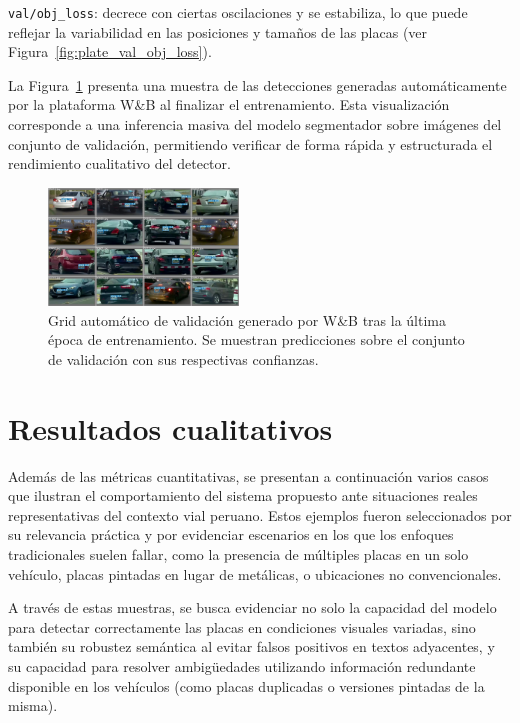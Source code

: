 \documentclass[conference]{IEEEtran}
\begin{document}
\texttt{val/obj\_loss}: decrece con ciertas oscilaciones y se estabiliza, lo que puede reflejar la variabilidad en las posiciones y tamaños de las placas (ver Figura~\ref{fig:plate_val_obj_loss}).

La Figura~\ref{fig:plate_val_grid} presenta una muestra de las detecciones generadas automáticamente por la plataforma W\&B al finalizar el entrenamiento. Esta visualización corresponde a una inferencia masiva del modelo segmentador sobre imágenes del conjunto de validación, permitiendo verificar de forma rápida y estructurada el rendimiento cualitativo del detector.

\begin{figure}[ht]
\centering
\includegraphics[width=0.45\textwidth]{figs/validation_matrix.jpg}
\caption{Grid automático de validación generado por W\&B tras la última época de entrenamiento. Se muestran predicciones sobre el conjunto de validación con sus respectivas confianzas.}
\label{fig:plate_val_grid}
\end{figure}


\section{Resultados cualitativos}

Además de las métricas cuantitativas, se presentan a continuación varios casos que ilustran el comportamiento del sistema propuesto ante situaciones reales representativas del contexto vial peruano. Estos ejemplos fueron seleccionados por su relevancia práctica y por evidenciar escenarios en los que los enfoques tradicionales suelen fallar, como la presencia de múltiples placas en un solo vehículo, placas pintadas en lugar de metálicas, o ubicaciones no convencionales.

A través de estas muestras, se busca evidenciar no solo la capacidad del modelo para detectar correctamente las placas en condiciones visuales variadas, sino también su robustez semántica al evitar falsos positivos en textos adyacentes, y su capacidad para resolver ambigüedades utilizando información redundante disponible en los vehículos (como placas duplicadas o versiones pintadas de la misma).
\end{document}
